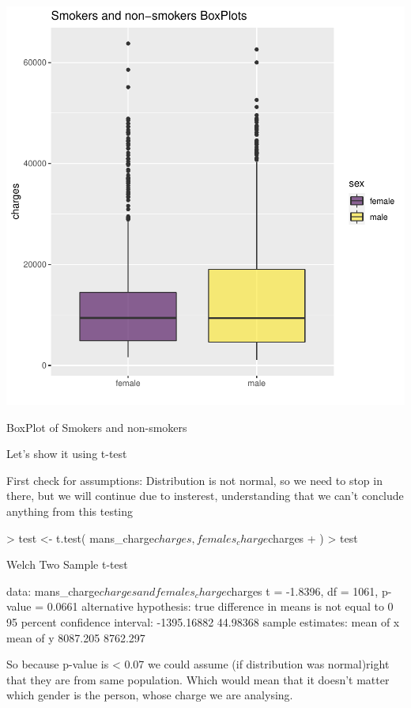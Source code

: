 \documentclass{article}
\begin{document}
\begin{centerfig}
\includegraphics{Untitled-038}
\caption{BoxPlot of Smokers and non-smokers}
\end{centerfig}

Let's show it using t-test

First check for assumptions:
Distribution is not normal, so we need to stop in there, but we will continue due to insterest, understanding that we can't conclude anything from this testing

\begin{Schunk}
\begin{Sinput}
> test <- t.test( mans_charge$charges, females_charge$charges
+ )
> test
\end{Sinput}
\begin{Soutput}
	Welch Two Sample t-test

data:  mans_charge$charges and females_charge$charges
t = -1.8396, df = 1061, p-value = 0.0661
alternative hypothesis: true difference in means is not equal to 0
95 percent confidence interval:
 -1395.16882    44.98368
sample estimates:
mean of x mean of y 
 8087.205  8762.297 
\end{Soutput}
\end{Schunk}

So because p-value is < 0.07 we could assume (if distribution was normal)right that they are from same population. Which would mean that it doesn't matter which gender is the person, whose charge we are analysing.
\end{document}
